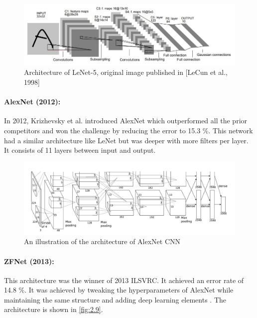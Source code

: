\begin{figure}[H]
	\centering
	\captionsetup{justification=centering,margin=2cm}
	\includegraphics[scale= 0.8]{CHAPTERS/Chapter-2/Images/2.7.jpg}
	\caption{Architecture of LeNet-5, original image published in [LeCun et al., 1998]}
	\label{fig:2.7}
\end{figure}


\paragraph*{AlexNet (2012):}
In 2012, Krizhevsky et al. introduced AlexNet which 
outperformed all the prior competitors and won the challenge 
by reducing the error to 15.3 \%.  This network had a similar architecture 
like LeNet but was deeper with more filters per layer. It 
consists of 11 layers between input and output. 

 
\begin{figure}[H]
	\centering
	\captionsetup{justification=centering,margin=2cm}
	\includegraphics[scale = 0.6]{CHAPTERS/Chapter-2/Images/2.8.jpg}
	\caption{An illustration of the architecture of AlexNet CNN}
	\label{fig:2.8}
\end{figure}

\paragraph*{ZFNet (2013):}
This architecture was the winner of 2013 ILSVRC. It achieved 
an error rate of 14.8 \%. It was achieved by tweaking the 
hyperparameters of AlexNet while maintaining the same structure and 
adding deep learning elements \cite{chap_2_article:11}. The architecture 
is shown in \ref{fig:2.9}.

